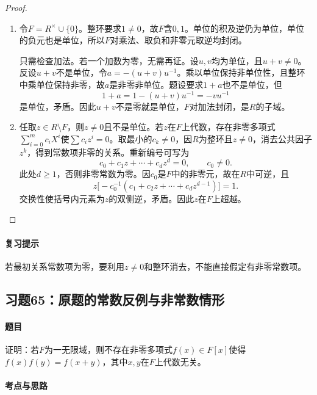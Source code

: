 \begin{proof}

\begin{enumerate}[label=(\roman*)]\item 令$F=R^\times\cup\{0\}$。整环要求$1\ne0$，故$F$含$0,1$。单位的积及逆仍为单位，单位的负元也是单位，所以$F$对乘法、取负和非零元取逆均封闭。

只需检查加法。若一个加数为零，无需再证。设$u,v$均为单位，且$u+v\ne0$。反设$u+v$不是单位，令$a=-(u+v)u^{-1}$。乘以单位保持非单位性，且整环中乘单位保持非零，故$a$是非零非单位。题设要求$1+a$也不是单位，但
\[
1+a=1-(u+v)u^{-1}=-vu^{-1}
\]
是单位，矛盾。因此$u+v$不是零就是单位，$F$对加法封闭，是$R$的子域。

\item 任取$z\in R\setminus F$，则$z\ne0$且不是单位。若$z$在$F$上代数，存在非零多项式$\sum_{i=0}^m c_iX^i$使$\sum c_iz^i=0$。取最小的$c_k\ne0$，因$R$为整环且$z\ne0$，消去公共因子$z^k$，得到常数项非零的关系。重新编号可写为
\[
c_0+c_1z+\cdots+c_dz^d=0,\qquad c_0\ne0.
\]
此处$d\ge1$，否则非零常数为零。因$c_0$是$F$中的非零元，故在$R$中可逆，且
\[
z\bigl[-c_0^{-1}(c_1+c_2z+\cdots+c_dz^{d-1})\bigr]=1.
\]
交换性使括号内元素为$z$的双侧逆，矛盾。因此$z$在$F$上超越。

\end{enumerate}

\end{proof}

\paragraph{复习提示}

若最初关系常数项为零，要利用$z\ne0$和整环消去，不能直接假定有非零常数项。



\subsection{习题65：原题的常数反例与非常数情形}

\label{ex:3:65}

\paragraph{题目}

证明：若$F$为一无限域，则不存在非零多项式$f(x)\in F[x]$使得$f(x)f(y)=f(x+y)$，其中$x,y$在$F$上代数无关。

\paragraph{考点与思路}

